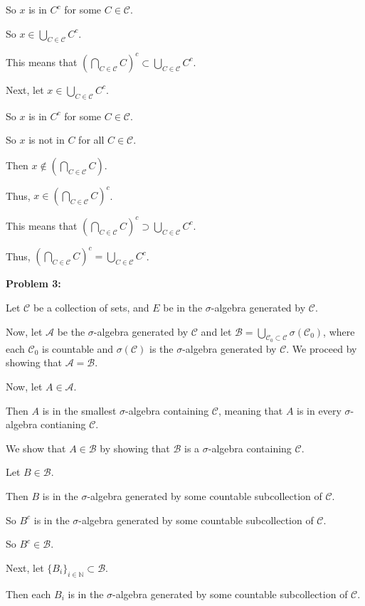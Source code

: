 \documentclass[a4paper,12pt]{article}
\newcommand{\tab}{\hspace{4mm}} %
\newcommand{\shunt}{\vspace{20mm}}
\newcommand{\N}{\mathbb{N}}
\newcommand{\scrA}{\mathcal{A}}
\newcommand{\scrB}{\mathcal{B}}
\newcommand{\scrC}{\mathcal{C}}
\begin{document}
\tab So $x$ is in $C^c$ for some $C \in \scrC$.

\tab So $x \in \bigcup\limits_{C \in \scrC} C^c$.

This means that $(\bigcap\limits_{C \in \scrC} C)^c \subset \bigcup\limits_{C \in \scrC} C^c$.

Next, let $x \in \bigcup\limits_{C \in \scrC} C^c$.

\tab So $x$ is in $C^c$ for some $C \in \scrC$.

\tab So $x$ is not in $C$ for all $C \in \scrC$.

\tab Then $x \notin (\bigcap\limits_{C \in \scrC} C)$.

\tab Thus, $x \in (\bigcap\limits_{C \in \scrC} C)^c$.

This means that $(\bigcap\limits_{C \in \scrC} C)^c \supset \bigcup\limits_{C \in \scrC} C^c$.

Thus, $(\bigcap\limits_{C \in \scrC} C)^c = \bigcup\limits_{C \in \scrC} C^c$.

\shunt

{\bf Problem 3:}

Let $\scrC$ be a collection of sets, and $E$ be in the $\sigma$-algebra generated by $\scrC$.

Now, let $\scrA$ be the $\sigma$-algebra generated by $\scrC$ and let $\scrB = \bigcup\limits_{\scrC_0 \subset \scrC} \sigma(\scrC_0)$, where each $\scrC_0$ is countable and $\sigma(\scrC)$ is the $\sigma$-algebra generated by $\scrC$. We proceed by showing that $\scrA = \scrB$.

Now, let $A \in \scrA$.

\tab Then $A$ is in the smallest $\sigma$-algebra containing $\scrC$, meaning that $A$ is in every $\sigma$-algebra contianing $\scrC$.

\tab We show that $A \in \scrB$ by showing that $\scrB$ is a $\sigma$-algebra containing $\scrC$.

\tab \tab Let $B \in \scrB$.

\tab \tab Then $B$ is in the $\sigma$-algebra generated by some countable subcollection of $\scrC$.

\tab \tab So $B^c$ is in the $\sigma$-algebra generated by some countable subcollection of $\scrC$.

\tab \tab So $B^c \in \scrB$.

\tab \tab Next, let $\{B_i\}_{i \in \N} \subset \scrB$.

\tab \tab Then each $B_i$ is in the $\sigma$-algebra generated by some countable subcollection of $\scrC$.
\end{document}
